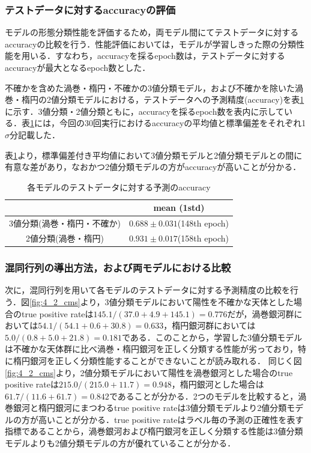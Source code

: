 \documentclass[a4j, 11pt]{jreport}
\begin{document}

\subsubsection{テストデータに対するaccuracyの評価}
モデルの形態分類性能を評価するため，両モデル間にてテストデータに対するaccuracyの比較を行う．性能評価においては，モデルが学習しきった際の分類性能を用いる．すなわち，accuracyを採るepoch数は，テストデータに対するaccuracyが最大となるepoch数とした．

不確かを含めた渦巻・楕円・不確かの3値分類モデル，および不確かを除いた渦巻・楕円の2値分類モデルにおける，テストデータへの予測精度(accuracy)を表\ref{tb:accs_4.2}に示す．3値分類・2値分類ともに，accuracyを採るepoch数を表内に示している．表\ref{tb:accs_4.2}には，今回の30回実行におけるaccuracyの平均値と標準偏差をそれぞれ1$\sigma$分記載した．

表\ref{tb:accs_4.2}より，標準偏差付き平均値において3値分類モデルと2値分類モデルとの間に有意な差があり，なおかつ2値分類モデルの方がaccuracyが高いことが分かる．

\begin{table}[htbp]
  \centering
	\caption{各モデルのテストデータに対する予測のaccuracy}
  \begin{tabular}{|c|c|}
		\hline
    & mean (1std) \\ \hline
    3値分類(渦巻・楕円・不確か) & $0.688 \pm 0.031$(148th epoch) \\ \hline
    2値分類(渦巻・楕円) & $0.931 \pm 0.017$(158th epoch) \\ \hline
  \end{tabular}
  \label{tb:accs_4.2}
\end{table}

\subsubsection{混同行列の導出方法，および両モデルにおける比較}
次に，混同行列を用いて各モデルのテストデータに対する予測精度の比較を行う．図\ref{fig:4_2_cms}より，3値分類モデルにおいて陽性を不確かな天体とした場合のtrue positive rateは$145.1/(37.0+4.9+145.1) = 0.776$だが，渦巻銀河群においては$54.1/(54.1+0.6+30.8) = 0.633$，楕円銀河群においては$5.0/(0.8+5.0+21.8) = 0.181$である．このことから，学習した3値分類モデルは不確かな天体群に比べ渦巻・楕円銀河を正しく分類する性能が劣っており，特に楕円銀河を正しく分類性能することができないことが読み取れる．
同じく図\ref{fig:4_2_cms}より，2値分類モデルにおいて陽性を渦巻銀河とした場合のtrue positive rateは$215.0/(215.0+11.7) = 0.948$，楕円銀河とした場合は$61.7/(11.6+61.7) = 0.842$であることが分かる．2つのモデルを比較すると，渦巻銀河と楕円銀河にまつわるtrue positive rateは3値分類モデルより2値分類モデルの方が高いことが分かる．true positive rateはラベル毎の予測の正確性を表す指標であることから，渦巻銀河および楕円銀河を正しく分類する性能は3値分類モデルよりも2値分類モデルの方が優れていることが分かる．
\end{document}
